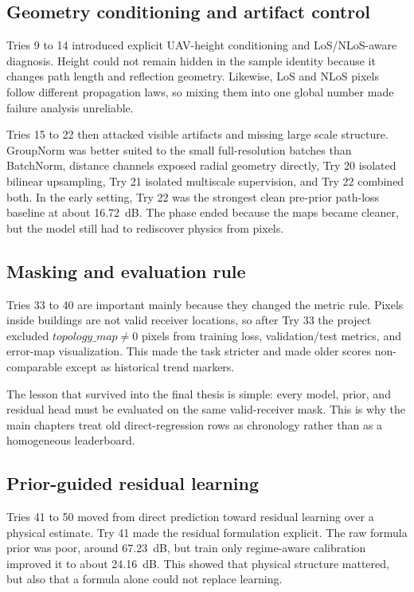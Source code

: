 \subsection{Geometry conditioning and artifact control}

Tries 9 to 14 introduced explicit UAV-height conditioning and LoS/NLoS-aware
diagnosis. Height could not remain hidden in the sample identity because it
changes path length and reflection geometry. Likewise, LoS and NLoS pixels
follow different propagation laws, so mixing them into one global number made
failure analysis unreliable.

Tries 15 to 22 then attacked visible artifacts and missing large scale structure.
GroupNorm was better suited to the small full-resolution batches than
BatchNorm, distance channels exposed radial geometry directly, Try 20 isolated
bilinear upsampling, Try 21 isolated multiscale supervision, and Try 22
combined both. In the early setting, Try 22 was the strongest clean
pre-prior path-loss baseline at about \SI{16.72}{dB}. The phase ended because
the maps became cleaner, but the model still had to rediscover physics from
pixels.

\subsection{Masking and evaluation rule}

Tries 33 to 40 are important mainly because they changed the metric rule.
Pixels inside buildings are not valid receiver locations, so after Try 33 the
project excluded \(topology\_map \ne 0\) pixels from training loss,
validation/test metrics, and error-map visualization. This made the task
stricter and made older scores non-comparable except as historical trend
markers.

The lesson that survived into the final thesis is simple: every model, prior,
and residual head must be evaluated on the same valid-receiver mask. This is
why the main chapters treat old direct-regression rows as chronology rather
than as a homogeneous leaderboard.

\subsection{Prior-guided residual learning}

Tries 41 to 50 moved from direct prediction toward residual learning over a
physical estimate. Try 41 made the residual formulation explicit. The raw
formula prior was poor, around \SI{67.23}{dB}, but train only regime-aware
calibration improved it to about \SI{24.16}{dB}. This showed that physical
structure mattered, but also that a formula alone could not replace learning.

